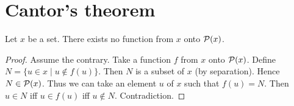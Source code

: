 \documentclass[../../sets-and-functions.ftl.tex]{subfiles}
\begin{document}
  \section{Cantor's theorem}

  \begin{forthel}
    \begin{theorem}[Cantor]
      Let $x$ be a set.
      There exists no function from $x$ onto $\mathcal{P}(x)$.
    \end{theorem}
    \begin{proof}
      Assume the contrary.
      Take a function $f$ from $x$ onto $\mathcal{P}(x)$.
      Define $N = \{ u \in x \mid u \notin f(u) \}$.
      Then $N$ is a subset of $x$ (by separation).
      Hence $N \in \mathcal{P}(x)$.
      Thus we can take an element $u$ of $x$ such that $f(u) = N$.
      Then $u \in N$ iff $u \in f(u)$ iff $u \notin N$.
      Contradiction.
    \end{proof}
  \end{forthel}
\end{document}
